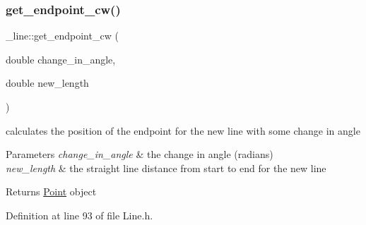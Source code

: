 \begin{DoxyCode}{0}

\end{DoxyCode}
\mbox{\label{struct__line_ac56b4f2909b66eb14910421a4589aca4}} 
\subsubsection{\texorpdfstring{get\_endpoint\_cw()}{get\_endpoint\_cw()}}
{\footnotesize\ttfamily \+\_\+line\+::get\+\_\+endpoint\+\_\+cw (\begin{DoxyParamCaption}\item[{double}]{change\+\_\+in\+\_\+angle,  }\item[{double}]{new\+\_\+length }\end{DoxyParamCaption})\hspace{0.3cm}{\ttfamily [inline]}}



calculates the position of the endpoint for the new line with some change in angle 


\begin{DoxyParams}{Parameters}
{\em change\+\_\+in\+\_\+angle} & the change in angle (radians) \\
\hline
{\em new\+\_\+length} & the straight line distance from start to end for the new line \\
\hline
\end{DoxyParams}
\begin{DoxyReturn}{Returns}
\mbox{\hyperlink{struct_point}{Point}} object 
\end{DoxyReturn}


Definition at line 93 of file Line.\+h.


